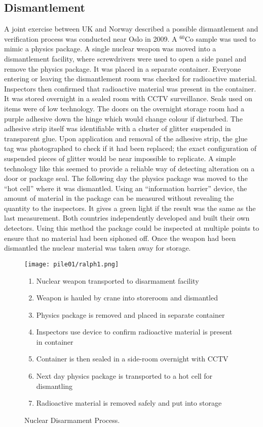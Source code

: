 \documentclass[twoside,titlepage,11pt,twocolumn,a4paper]{article}
\begin{document}
\subsection{Dismantlement}
A joint exercise between UK and Norway described a possible
dismantlement and verification process was conducted near Oslo in
2009. A \( \mathrm{^{60}Co} \) sample was used to mimic a physics
package. A single nuclear weapon was moved into a dismantlement
facility, where screwdrivers were used to open a side panel and remove
the physics package. It was placed in a separate container. Everyone
entering or leaving the dismantlement room was checked for radioactive
material. Inspectors then confirmed that radioactive material was
present in the container. It was stored overnight in a sealed room
with CCTV surveillance. Seals used on items were of low
technology. The doors on the overnight storage room had a purple
adhesive down the hinge which would change colour if disturbed. The
adhesive strip itself was identifiable with a cluster of glitter
suspended in transparent glue. Upon application and removal of the
adhesive strip, the glue tag was photographed to check if it had been
replaced; the exact configuration of suspended pieces of glitter would
be near impossible to replicate. A simple technology like this seemed
to provide a reliable way of detecting alteration on a door or package
seal. The following day the physics package was moved to the ``hot
cell'' where it was dismantled. Using an ``information barrier''
device, the amount of material in the package can be measured without
revealing the quantity to the inspectors. It gives a green light if
the result was the same as the last measurement. Both countries
independently developed and built their own detectors. Using this
method the package could be inspected at multiple points to ensure
that no material had been siphoned off. Once the weapon had been
dismantled the nuclear material was taken away for
storage. \citep{dismantleBBC2009}

\begin{figure}
  \texttt{[image: pile01/ralph1.png]}
  \caption{Nuclear Disarmament Process. \citep{dismantleBBC2009}}
    \begin{enumerate}
      \item Nuclear weapon transported to disarmament facility
      \item Weapon is hauled by crane into storeroom and dismantled 
      \item Physics package is removed and placed in separate container
      \item Inspectors use device to confirm radioactive material is
        present in container
      \item Container is then sealed in a side-room overnight with CCTV
      \item Next day physics package is transported to a hot cell for
        dismantling
      \item Radioactive material is removed safely and put into storage 
    \end{enumerate}
\end{figure}
\end{document}
